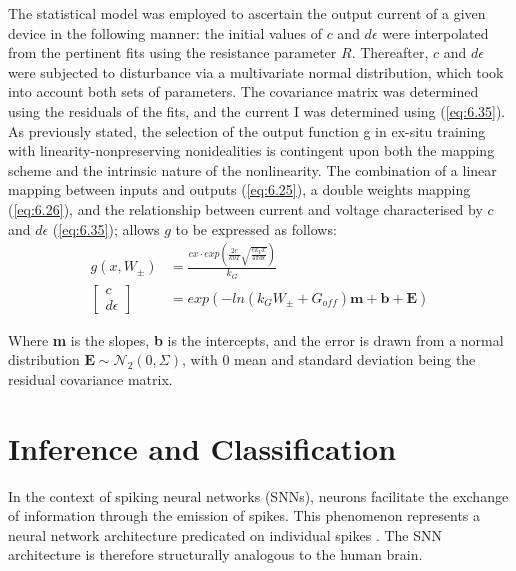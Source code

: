 \noindent The statistical model was employed to ascertain the output current of a given device in the following manner: the initial values of $c$ and $d\epsilon$ were interpolated from the pertinent fits using the resistance parameter $R$. Thereafter, $c$ and $d\epsilon$ were subjected to disturbance via a multivariate normal distribution, which took into account both sets of parameters. The covariance matrix was determined using the residuals of the fits, and the current I was determined using (\ref{eq:6.35}).\\

\noindent As previously stated, the selection of the output function g in ex-situ training with linearity-nonpreserving nonidealities is contingent upon both the mapping scheme and the intrinsic nature of the nonlinearity. The combination of a linear mapping between inputs and outputs (\ref{eq:6.25}), a double weights mapping (\ref{eq:6.26}), and the relationship between current and voltage characterised by $c$ and $d\epsilon$ (\ref{eq:6.35}); allows $g$ to be expressed as follows:
\begin{align}
g\left( x, W_\pm \right) &= \frac{cx\cdot exp\left( \frac{2e}{kbT} \sqrt{\frac{ek_Vx}{4\pi d\epsilon}} \right)}{k_G} \label{eq:6.36} \\
\begin{bmatrix} c \\  d\epsilon \end{bmatrix} &= exp\left( -ln\left( k_GW_\pm + G_{off} \right)\textbf{m} + \textbf{b} + \textbf{E} \right) \label{eq:6.37}
\end{align}

\noindent Where \textbf{m} is the slopes, \textbf{b} is the intercepts, and the error is drawn from a normal distribution $\textbf{E} \sim \mathcal{N}_2\left( 0, \Sigma \right)$, with 0 mean and standard deviation being the residual covariance matrix.

\section{Inference and Classification}

In the context of spiking neural networks (SNNs), neurons facilitate the exchange of information through the emission of spikes. This phenomenon represents a neural network architecture predicated on individual spikes \cite{liu2014memristor}. The SNN architecture is therefore structurally analogous to the human brain. \\

